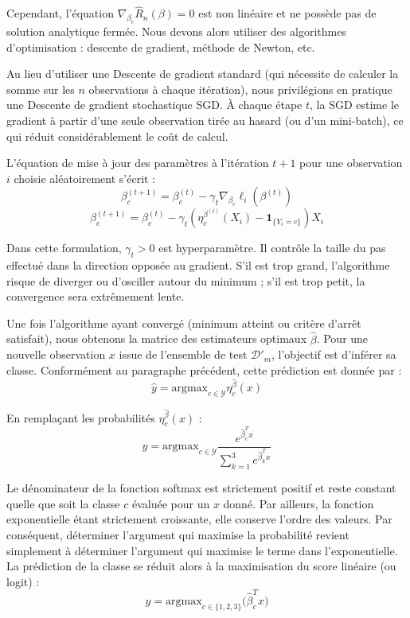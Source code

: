 \documentclass[a4paper,11pt]{paper}
\theoremstyle{plain}
\theoremstyle{definition}
\theoremstyle{remark}
\begin{document}
Cependant, l'équation $\nabla_{\beta_c} \hat{R}_n(\beta) = 0$ est non linéaire et ne possède pas de solution analytique fermée. Nous devons alors utiliser des algorithmes d'optimisation : descente de gradient, méthode de Newton, etc.

Au lieu d'utiliser une Descente de gradient standard (qui nécessite de calculer la somme sur les $n$ observations à chaque itération), nous privilégions en pratique une Descente de gradient stochastique SGD. À chaque étape $t$, la SGD estime le gradient à partir d'une seule observation tirée au hasard (ou d'un mini-batch), ce qui réduit considérablement le coût de calcul.

L'équation de mise à jour des paramètres à l'itération $t+1$ pour une observation $i$ choisie aléatoirement s'écrit :
$$\beta_c^{(t+1)} = \beta_c^{(t)} - \gamma_t \nabla_{\beta_c} \ell_i(\beta^{(t)})$$
$$\beta_c^{(t+1)} = \beta_c^{(t)} - \gamma_t \left( \eta_c^{\beta^{(t)}}(X_i) - \mathbf{1}_{\{Y_i = c\}} \right) X_i$$

Dans cette formulation, $\gamma_t > 0$ est hyperparamètre. Il contrôle la taille du pas effectué dans la direction opposée au gradient. S'il est trop grand, l'algorithme risque de diverger ou d'osciller autour du minimum ; s'il est trop petit, la convergence sera extrêmement lente.

Une fois l'algorithme ayant convergé (minimum atteint ou critère d'arrêt satisfait), nous obtenons la matrice des estimateurs optimaux $\hat{\beta}$. Pour une nouvelle observation $x$ issue de l'ensemble de test $\mathcal{D}'_m$, l'objectif est d'inférer sa classe. Conformément au paragraphe précédent, cette prédiction est donnée par :
$$\hat{y} = \text{argmax}_{c \in \mathcal{Y}} \eta_c^{\hat{\beta}}(x)$$

En remplaçant les probabilités $\eta_c^{\hat{\beta}}(x)$ :
$$\hat{y} = \text{argmax}_{c \in \mathcal{Y}} \frac{e^{\hat{\beta}_c^T x}}{\sum_{k=1}^3 e^{\hat{\beta}_k^T x}}$$

Le dénominateur de la fonction softmax est strictement positif et reste constant quelle que soit la classe $c$ évaluée pour un $x$ donné. Par ailleurs, la fonction exponentielle étant strictement croissante, elle conserve l'ordre des valeurs. Par conséquent, déterminer l'argument qui maximise la probabilité revient simplement à déterminer l'argument qui maximise le terme dans l'exponentielle. La prédiction de la classe se réduit alors à la maximisation du score linéaire (ou logit) :
$$\hat{y} = \text{argmax}_{c \in \{1, 2, 3\}} \big( \hat{\beta}_c^T x \big)$$
\end{document}
